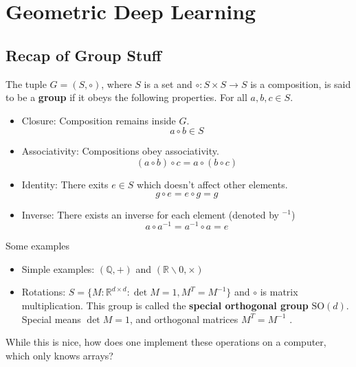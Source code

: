 \section{Geometric Deep Learning}
\subsection{Recap of Group Stuff}
\begin{definition}
	[Group] The tuple $G = (S, \circ)$, where $S$ is a set and $\circ: S \times S \to S$ is a composition, is said to be a \textbf{group} if it obeys the following properties. For all $a,b,c \in S$.
	\begin{itemize}
		\item Closure: Composition remains inside $G$. $$a \circ b \in S$$
		\item Associativity: Compositions obey associativity. $$(a \circ b) \circ c = a \circ (b \circ c)$$
		\item Identity: There exits $e \in S$ which doesn't affect other elements. $$g \circ e = e \circ g = g$$
		\item Inverse: There exists an inverse for each element (denoted by $^{-1}$) $$a \circ a^{-1} = a^{-1} \circ a = e$$
	\end{itemize}
\end{definition}
Some examples 
\begin{itemize}
	\item Simple examples: $(\mathbb Q, +)$ and $(\mathbb R \backslash 0, \times)$
	\item Rotations: $S = \{M : \mathbb R^{d \times d}: \det M  = 1, M^T = M^{-1}\}$ and $\circ$ is matrix multiplication. This group is called the \textbf{special orthogonal group} $\text{SO}(d)$. Special means $\det M = 1$, and orthogonal matrices $M^T = M^{-1}$ .
\end{itemize}
While this is nice, how does one implement these operations on a computer, which only knows arrays?

